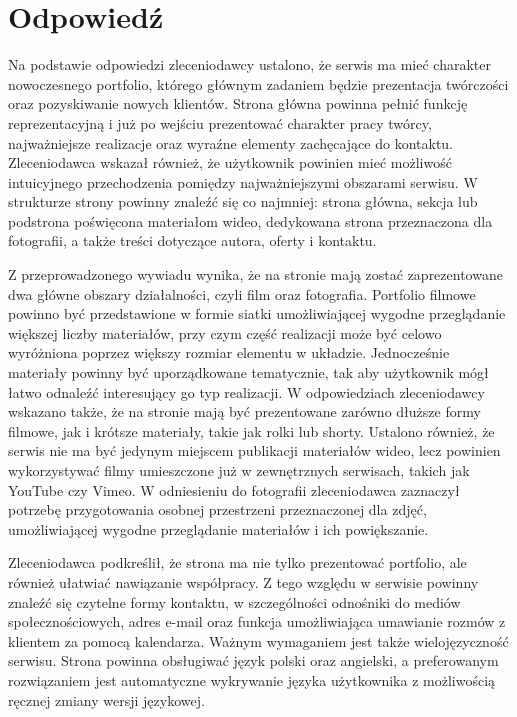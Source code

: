\section{Odpowiedź}
Na podstawie odpowiedzi zleceniodawcy ustalono, że serwis ma mieć charakter nowoczesnego portfolio, którego głównym zadaniem będzie prezentacja twórczości oraz pozyskiwanie nowych klientów. Strona główna powinna pełnić funkcję reprezentacyjną i już po wejściu prezentować charakter pracy twórcy, najważniejsze realizacje oraz wyraźne elementy zachęcające do kontaktu. Zleceniodawca wskazał również, że użytkownik powinien mieć możliwość intuicyjnego przechodzenia pomiędzy najważniejszymi obszarami serwisu. W strukturze strony powinny znaleźć się co najmniej: strona główna, sekcja lub podstrona poświęcona materiałom wideo, dedykowana strona przeznaczona dla fotografii, a także treści dotyczące autora, oferty i kontaktu.

Z przeprowadzonego wywiadu wynika, że na stronie mają zostać zaprezentowane dwa główne obszary działalności, czyli film oraz fotografia. Portfolio filmowe powinno być przedstawione w formie siatki umożliwiającej wygodne przeglądanie większej liczby materiałów, przy czym część realizacji może być celowo wyróżniona poprzez większy rozmiar elementu w układzie. Jednocześnie materiały powinny być uporządkowane tematycznie, tak aby użytkownik mógł łatwo odnaleźć interesujący go typ realizacji. W odpowiedziach zleceniodawcy wskazano także, że na stronie mają być prezentowane zarówno dłuższe formy filmowe, jak i krótsze materiały, takie jak rolki lub shorty. Ustalono również, że serwis nie ma być jedynym miejscem publikacji materiałów wideo, lecz powinien wykorzystywać filmy umieszczone już w zewnętrznych serwisach, takich jak YouTube czy Vimeo. W odniesieniu do fotografii zleceniodawca zaznaczył potrzebę przygotowania osobnej przestrzeni przeznaczonej dla zdjęć, umożliwiającej wygodne przeglądanie materiałów i ich powiększanie.

Zleceniodawca podkreślił, że strona ma nie tylko prezentować portfolio, ale również ułatwiać nawiązanie współpracy. Z tego względu w serwisie powinny znaleźć się czytelne formy kontaktu, w szczególności odnośniki do mediów społecznościowych, adres e-mail oraz funkcja umożliwiająca umawianie rozmów z klientem za pomocą kalendarza. Ważnym wymaganiem jest także wielojęzyczność serwisu. Strona powinna obsługiwać język polski oraz angielski, a preferowanym rozwiązaniem jest automatyczne wykrywanie języka użytkownika z możliwością ręcznej zmiany wersji językowej.


